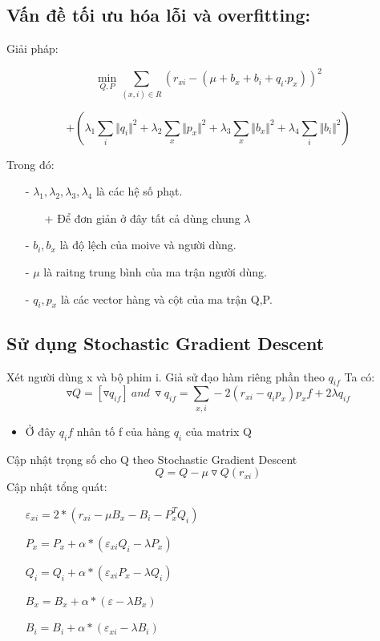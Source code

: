 \documentclass[a4paper,11pt]{report}
\begin{document}
\subsection{Vấn đề tối ưu hóa lỗi và overfitting:}
Giải pháp:
\begin{flushleft}
\begin{displaymath}
\displaystyle \min_{Q,P} \sum_{(x,i)\in R}(r_{xi} - (\mu + b_x + b_i + q_i.p_x))^2
\end{displaymath}
\end{flushleft}
\begin{center}
\begin{displaymath}
\displaystyle
+ (\lambda_1\sum_{i}\Vert q_i \Vert^{2} + \lambda_2\sum_x\Vert p_x \Vert^2 + \lambda_3\sum_x\Vert b_x \Vert^2 + \lambda_4\sum_i\Vert b_i \Vert^2)
\end{displaymath}
\end{center}
Trong đó:
\begin{itemize}
\item[-] $\lambda_1,\lambda_2,\lambda_3,\lambda_4$ là các hệ số phạt.
\begin{itemize}
\item[+] Để đơn giản ở đây tất cả dùng chung $\lambda$
\end{itemize}
\item[-] $b_i,b_x$ là độ lệch của moive và người dùng.
\item[-] $\mu$ là raitng trung bình của ma trận người dùng.
\item[-] $q_i,p_x$ là các vector hàng và cột của ma trận Q,P.
\end{itemize}
\newpage
\subsection{Sử dụng Stochastic Gradient Descent}
Xét người dùng x và bộ phim i. Giả sử đạo hàm riêng phần theo $q_{if}$ Ta có:
\begin{displaymath}
\triangledown Q = [\triangledown q_{if}] \  and  \ 
\triangledown q_{if} = \sum_{x,i} - 2(r_{xi} - q_ip_x)p_xf + 2\lambda q_{if}
\end{displaymath}
\begin{itemize}
\item Ở đây $q_if$ nhân tố f của hàng $q_i$ của matrix Q
\end{itemize}
Cập nhật trọng số cho Q theo Stochastic Gradient Descent
\begin{displaymath}
Q = Q - \mu \triangledown Q(r_{xi})
\end{displaymath}
Cập nhật tổng quát:
\begin{itemize}
\item[] $\varepsilon_{xi} = 2*(r_{xi} - \mu B_x - B_i - P_x^TQ_i)$
\item[] $P_x = P_x + \alpha *(\varepsilon_{xi}Q_i - \lambda P_x)$
\item[] $Q_i = Q_i + \alpha *(\varepsilon_{xi}P_x - \lambda Q_i)$
\item[] $B_x = B_x + \alpha *(\varepsilon - \lambda B_x)$
\item[] $B_i = B_i + \alpha *(\varepsilon_{xi} - \lambda B_i)$
\end{itemize}
\end{document}
